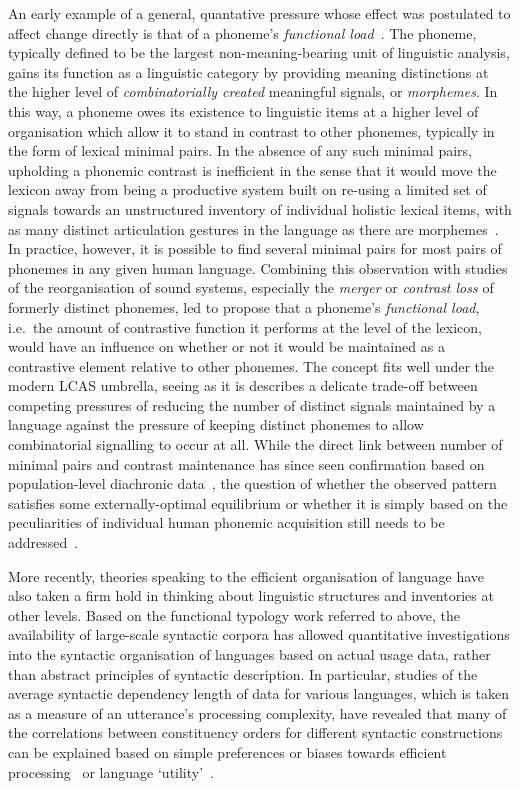 An early example of a general, quantative pressure whose effect was postulated to affect change directly is that of a phoneme's \emph{functional load}~\citep{Martinet1955}. The phoneme, typically defined to be the largest non-meaning-bearing unit of linguistic analysis, gains its function as a linguistic category by providing meaning distinctions at the higher level of \emph{combinatorially created} meaningful signals, or \emph{morphemes}. In this way, a phoneme owes its existence to linguistic items at a higher level of organisation which allow it to stand in contrast to other phonemes, typically in the form of lexical minimal pairs. In the absence of any such minimal pairs, upholding a phonemic contrast is inefficient in the sense that it would move the lexicon away from being a productive system built on re-using a limited set of signals towards an unstructured inventory of individual holistic lexical items, with as many distinct articulation gestures in the language as there are morphemes~\citep{Spike2017}.
In practice, however, it is possible to find several minimal pairs for most pairs of phonemes in any given human language. Combining this observation with studies of the reorganisation of sound systems, especially the \emph{merger} or \emph{contrast loss} of formerly distinct phonemes, led \citet{Martinet1955} to propose that a phoneme's \emph{functional load}, i.e.~the amount of contrastive function it performs at the level of the lexicon, would have an influence on whether or not it would be maintained as a contrastive element relative to other phonemes. The concept fits well under the modern LCAS umbrella, seeing as it is describes a delicate trade-off between competing pressures of reducing the number of distinct signals maintained by a language against the pressure of keeping distinct phonemes to allow combinatorial signalling to occur at all. While the direct link between number of minimal pairs and contrast maintenance has since seen confirmation based on population-level diachronic data~\citep{Wedel2013short}, the question of whether the observed pattern satisfies some externally-optimal equilibrium or whether it is simply based on the peculiarities of individual human phonemic acquisition still needs to be addressed~\citep{Spike2017}.

More recently, theories speaking to the efficient organisation of language have also taken a firm hold in thinking about linguistic structures and inventories at other levels.
Based on the functional typology work referred to above, the availability of large-scale syntactic corpora has allowed quantitative investigations into the syntactic organisation of languages based on actual usage data, rather than abstract principles of syntactic description. In particular, studies of the average syntactic dependency length of data for various languages, which is taken as a measure of an utterance's processing complexity, have revealed that many of the correlations between constituency orders for different syntactic constructions can be explained based on simple preferences or biases towards efficient processing~\citep{Futrell2015} or language `utility'~\citep{Jaeger2010}.

